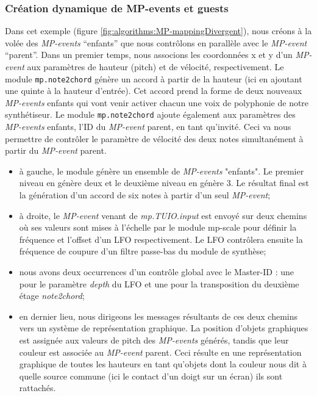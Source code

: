 \subsubsection{Création dynamique de MP-events et guests}

\noindent Dans cet exemple (figure \ref{fig:algorithms:MP-mappingDivergent}), nous créons à la volée des \textit{MP-events} ``enfants'' que nous contrôlons en parallèle avec le \textit{MP-event} ``parent''.
Dans un premier temps, nous associons les coordonnées x et y d'un \textit{MP-event} aux paramètres de hauteur (pitch) et de vélocité, respectivement. Le module \verb|mp.note2chord| génère un accord à partir de la hauteur (ici en ajoutant une quinte à la hauteur d'entrée). Cet accord prend la forme de deux nouveaux \textit{MP-events} enfants qui vont venir activer chacun une voix de polyphonie de notre synthétiseur. Le module \verb|mp.note2chord| ajoute également aux paramètres des \textit{MP-events} enfants, l'ID du \textit{MP-event} parent, en tant qu'invité. Ceci va nous permettre de contrôler le paramètre de vélocité des deux notes simultanément à partir du \textit{MP-event} parent. 

\vspace{-1em}
\begin{itemize}[noitemsep]
	\item à gauche, le module  génère un ensemble de \textit{MP-events} "enfants". Le premier niveau en génère deux et le deuxième niveau en génère 3. Le résultat final est la génération d'un accord de six notes à partir d'un seul \textit{MP-event};
	\item à droite, le \textit{MP-event} venant de \textit{mp.TUIO.input} est envoyé sur deux chemins où ses valeurs sont mises à l'échelle par le module mp-scale pour définir la fréquence et l'offset d'un LFO respectivement. Le \gls{LFO} contrôlera ensuite la fréquence de coupure d'un filtre passe-bas du module de synthèse;
	\item nous avons deux occurrences d'un contrôle global avec le Master-ID : une pour le paramètre \textit{depth} du LFO et une pour la transposition du deuxième étage \textit{note2chord};
	\item en dernier lieu, nous dirigeons les messages résultants de ces deux chemins vers un système de représentation graphique. La position d'objets graphiques est assignée aux valeurs de pitch des \textit{MP-events} générés, tandis que leur couleur est associée au \textit{MP-event} parent. Ceci résulte en une représentation graphique de toutes les hauteurs en tant qu'objets dont la couleur nous dit à quelle source commune (ici le contact d'un doigt sur un écran) ils sont rattachés.
\end{itemize}

